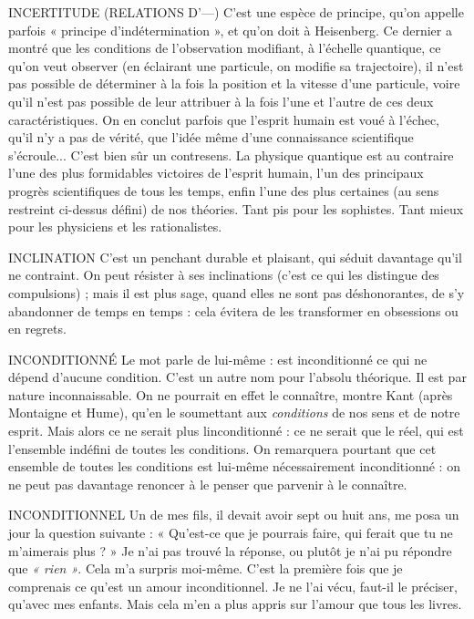 INCERTITUDE (RELATIONS D’—) C’est une espèce de principe, qu’on
appelle parfois « principe d’indétermination »,
et qu’on doit à Heisenberg. Ce dernier a montré que les conditions
de l'observation modifiant, à l'échelle quantique, ce qu’on veut observer (en
éclairant une particule, on modifie sa trajectoire), il n’est pas possible de déterminer
à la fois la position et la vitesse d’une particule, voire qu’il n’est pas possible
de leur attribuer à la fois l’une et l’autre de ces deux caractéristiques. On
en conclut parfois que l'esprit humain est voué à l’échec, qu’il n’y a pas de
vérité, que l’idée même d’une connaissance scientifique s’écroule... C’est bien
sûr un contresens. La physique quantique est au contraire l’une des plus formidables
victoires de l'esprit humain, l’un des principaux progrès scientifiques de
tous les temps, enfin l’une des plus certaines (au sens restreint ci-dessus défini)
de nos théories. Tant pis pour les sophistes. Tant mieux pour les physiciens et
les rationalistes.

INCLINATION C’est un penchant durable et plaisant, qui séduit davantage
qu’il ne contraint. On peut résister à ses inclinations (c’est
ce qui les distingue des compulsions) ; mais il est plus sage, quand elles ne sont
pas déshonorantes, de s’y abandonner de temps en temps : cela évitera de les
transformer en obsessions ou en regrets.

INCONDITIONNÉ Le mot parle de lui-même : est inconditionné ce qui ne
dépend d’aucune condition. C’est un autre nom pour
l'absolu théorique. Il est par nature inconnaissable. On ne pourrait en effet le
connaître, montre Kant (après Montaigne et Hume), qu’en le soumettant aux
{\it conditions} de nos sens et de notre esprit. Mais alors ce ne serait plus
linconditionné : ce ne serait que le réel, qui est l’ensemble indéfini de toutes les
conditions. On remarquera pourtant que cet ensemble de toutes les conditions
est lui-même nécessairement inconditionné : on ne peut pas davantage
renoncer à le penser que parvenir à le connaître.

INCONDITIONNEL Un de mes fils, il devait avoir sept ou huit ans, me
posa un jour la question suivante : « Qu'est-ce que je
pourrais faire, qui ferait que tu ne m'aimerais plus ? » Je n’ai pas trouvé la
réponse, ou plutôt je n’ai pu répondre que {\it « rien »}. Cela m’a surpris moi-même.
C’est la première fois que je comprenais ce qu’est un amour inconditionnel.
Je ne l'ai vécu, faut-il le préciser, qu'avec mes enfants. Mais cela m’en
a plus appris sur l’amour que tous les livres.

